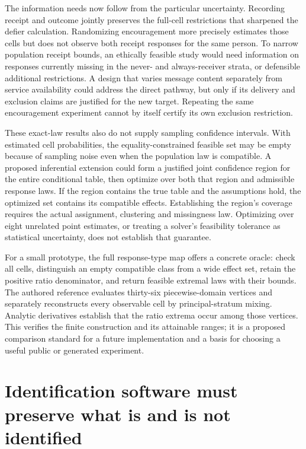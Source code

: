 The information needs now follow from the particular uncertainty.
Recording receipt and outcome jointly preserves the full-cell restrictions
that sharpened the defier calculation. Randomizing encouragement more
precisely estimates those cells but does not observe both receipt
responses for the same person. To narrow population receipt bounds, an
ethically feasible study would need information on responses currently
missing in the never- and always-receiver strata, or defensible additional
restrictions. A design that varies message content separately from service
availability could address the direct pathway, but only if its delivery
and exclusion claims are justified for the new target. Repeating the
same encouragement experiment cannot by itself certify its own exclusion
restriction.

These exact-law results also do not supply sampling confidence intervals.
With estimated cell probabilities, the equality-constrained feasible set
may be empty because of sampling noise even when the population law is
compatible. A proposed inferential extension could form a justified joint
confidence region for the entire conditional table, then optimize over
both that region and admissible response laws. If the region contains
the true table and the assumptions hold, the optimized set contains its
compatible effects. Establishing the region's coverage requires the actual
assignment, clustering and missingness law. Optimizing over eight unrelated
point estimates, or treating a solver's feasibility tolerance as statistical
uncertainty, does not establish that guarantee.

For a small prototype, the full response-type map offers a concrete oracle:
check all cells, distinguish an empty compatible class from a wide effect
set, retain the positive ratio denominator, and return feasible extremal
laws with their bounds. The authored reference evaluates thirty-six
piecewise-domain vertices and separately reconstructs every observable
cell by principal-stratum mixing. Analytic derivatives establish that
the ratio extrema occur among those vertices. This verifies the finite
construction and its attainable ranges; it is a proposed comparison
standard for a future implementation and a basis for choosing a useful
public or generated experiment.~\citep{exec17_s3_sensitivity}
\label{exec17:s3-sensitivity-end}


\section{Identification software must preserve what is and is not identified}
\label{exec18:r-identification}

